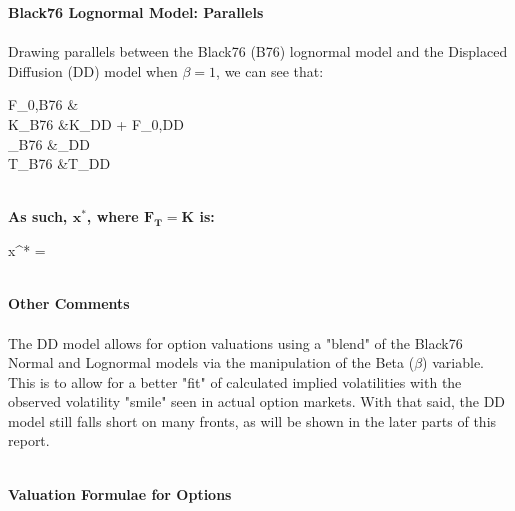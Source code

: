 \documentclass{article}
\begin{document}
\begin{minipage}[t]{0.42\textwidth}
	\begin{tcolorbox}[height=15.5cm,boxsep=5pt,arc=0pt,auto outer arc,colback=white,colframe=black]
		\noindent \textbf{Black76 Lognormal Model: Parallels}\\ \\
		Drawing parallels between the Black76 (B76) lognormal model and the Displaced Diffusion (DD) model when $\beta = 1$, we can see that:
		\begin{flalign*}
		F_{0,\textnormal{B76}} &\to {}\\ K_{\textnormal{B76}} &\to K_{\textnormal{DD}} +  F_{0,\textnormal{DD}}\\
		\sigma_{\textnormal{B76}} &\to \beta \sigma_{\textnormal{DD}}\\
		T_{\textnormal{B76}} &\to T_{\textnormal{DD}}
		\end{flalign*}\\
		\noindent \textbf{As such, $\boldsymbol{x^*}$, where $\boldsymbol{F_T=K}$ is:}
		\begin{flalign*}
		x^* = \frac{\log\left( \frac{K + (1 - \beta)/(\beta) F_0}{F_{0} / \beta} \right) + \frac{(\beta \sigma)^2 T}{2}}{\beta \sigma \sqrt{T}}
		\end{flalign*}\\
		\textbf{Other Comments}\\ \\
		The DD model allows for option valuations using a "blend" of the Black76 Normal and Lognormal models via the manipulation of the Beta ($\beta$) variable. This is to allow for a better "fit" of calculated implied volatilities with the observed volatility "smile" seen in actual option markets. With that said, the DD model still falls short on many fronts, as will be shown in the later parts of this report.
	\end{tcolorbox}
\end{minipage}\\

\noindent \textbf{Valuation Formulae for Options}
\\

\end{document}
